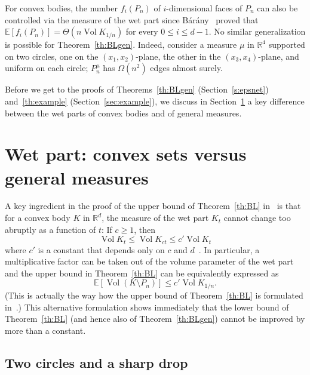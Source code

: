 \documentclass[10pt]{amsart}
\theoremstyle{definition}\newtheorem{defi}[theo]{Definition}\newtheorem{rema}[theo]{Remark}\newtheorem{exam}[theo]{Example}\newtheorem{exem}[theo]{Example}\newtheorem{nota}[theo]{Notation}
\DeclareMathOperator{\vol}{Vol}
\newcommand{\Rbb}{\mathbb{R}}%
\newcommand{\Ebb}{\mathbb{E}}%
\begin{document}

For convex bodies, the number $f_i(P_n)$ of $i$-dimensional faces of $P_n$ can also be controlled via the measure of the wet part since Bárány~\cite{Bar} proved that $\Ebb[f_i(P_n)]= \Theta(n \vol K_{1/n})$ for every $0 \le i \le d-1$. No similar generalization is possible for Theorem~\ref{th:BLgen}. Indeed, consider a measure $\mu$ in $\Rbb^4$ supported on two circles, one on the $(x_1,x_2)$-plane, the other in the $(x_3,x_4)$-plane, and uniform on each circle; $P_n^\mu$ has $\Omega(n^2)$ edges almost surely.



Before we get to the proofs of Theorems~\ref{th:BLgen} (Section~\ref{s:epsnet}) and~\ref{th:example} (Section~\ref{sec:example}), we discuss in Section~\ref{s:regularity} a key difference between the wet parts of convex bodies and of general measures.


\section{Wet part: convex sets versus general measures}\label{s:regularity}

A key ingredient in the proof of the upper bound of Theorem~\ref{th:BL} in~\cite{BarLar} is that for a convex body $K$ in $\Rbb^d$, the measure of the wet part $K_t$ cannot change too abruptly as a function of $t$: If $c\ge 1$, then
\begin{equation}\label{eq:wet}
\vol K_t \le \vol K_{ct} \le c' \vol K_t
\end{equation}
where $c'$ is a constant that depends only on $c$ and $d$~\cite[Theorem~7]{BarLar}. In particular, a multiplicative factor can be taken out of the volume parameter of the wet part and the upper bound in Theorem~\ref{th:BL} can be equivalently expressed as
\begin{equation}\label{eq:alternative}
\Ebb[\vol(K\setminus P_n)] \le c' \vol K_{1/n}.
\end{equation}
(This is actually the way how the upper bound of Theorem~\ref{th:BL} is formulated in~\cite[Theorem~1]{BarLar}.) This alternative formulation shows immediately that the lower bound of Theorem~\ref{th:BL} (and hence also of Theorem~\ref{th:BLgen}) cannot be improved by more than a constant.


\subsection{Two circles and a sharp drop}
\end{document}
